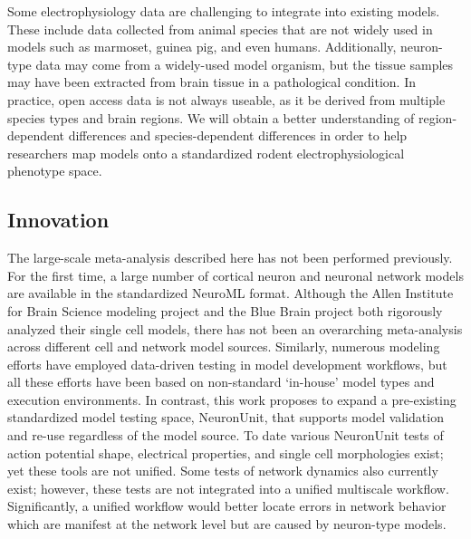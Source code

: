 Some electrophysiology data are challenging to integrate into existing models. These include data collected from animal species that are not widely used in models such as marmoset, guinea pig, and even humans. Additionally, neuron-type data may come from a widely-used model organism, but the tissue samples may have been extracted from brain tissue in a pathological condition. In practice, open access data is not always useable, as it be derived from multiple species types and brain regions. We will obtain a better understanding of region-dependent differences and species-dependent differences in order to help researchers map models onto a standardized rodent electrophysiological phenotype space.\newline
\newline

\subsection{Innovation}
The large-scale meta-analysis described here has not been performed previously. For the first time, a large number of cortical neuron and neuronal network models are available in the standardized NeuroML format. Although the Allen Institute for Brain Science modeling project and the Blue Brain project both rigorously analyzed their single cell models, there has not been an overarching meta-analysis across different cell and network model sources. Similarly, numerous modeling efforts have employed data-driven testing in model development workflows, but all these efforts have been based on non-standard ‘in-house’ model types and execution environments. In contrast, this work proposes to expand a pre-existing standardized model testing space, NeuronUnit, that supports model validation and re-use regardless of the model source. To date various NeuronUnit tests of action potential shape, electrical properties, and single cell morphologies exist; yet these tools are not unified. Some tests of network dynamics also currently exist; however, these tests are not integrated into a unified multiscale workflow. Significantly, a unified workflow would better locate errors in network behavior which are manifest at the network level but are caused by neuron-type models. \newline
\newline

